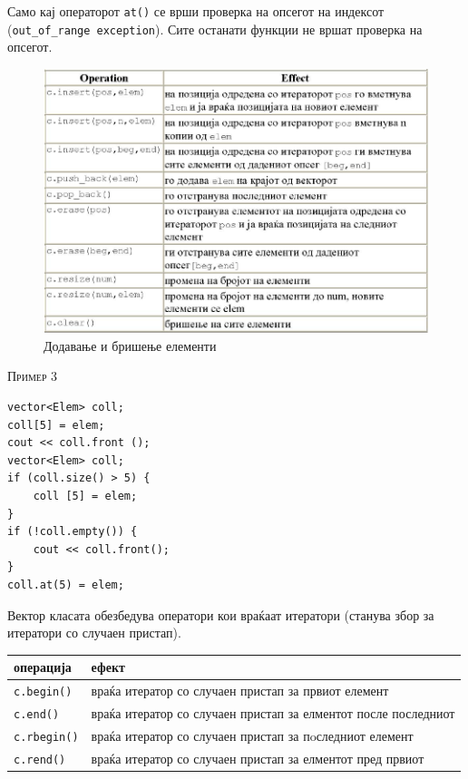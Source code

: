Само кај операторот \texttt{at()} се врши проверка на опсегот на индексот
(\texttt{out\_of\_range exception}). Сите останати функции не вршат проверка на
опсегот.

\begin{figure}[htb]
\centering
\includegraphics[width=\textwidth]{images/add_remove}
\caption{Додавање и бришење елементи}
\label{fig:add_remove}
\end{figure}
   
\textsc{Пример 3}

\begin{lstlisting}
vector<Elem> coll;
coll[5] = elem;
cout << coll.front ();
vector<Elem> coll;
if (coll.size() > 5) {
	coll [5] = elem;
}
if (!coll.empty()) {
	cout << coll.front();
}
coll.at(5) = elem;
\end{lstlisting}  

Вектор класата обезбедува оператори кои враќаат итератори (станува збор за
итератори со случаен пристап). 
   
\begin{center}
  \begin{tabular}{ | l | p{7cm} |}
	\hline
	\textbf{операција} & \textbf{ефект}\\
	\hline
	\texttt{c.begin()} & враќа итератор со случаен пристап за првиот елемент \\
	\hline
	\texttt{c.end()} &  враќа итератор со случаен пристап за елментот после
	последниот\\ 
	\hline
	\texttt{c.rbegin()} & враќа итератор со случаен пристап за пoследниот елемент
	\\ \hline
	\texttt{c.rend()} & враќа итератор со случаен пристап за елментот пред првиот\\
	\hline
  \end{tabular}    
\end{center}

